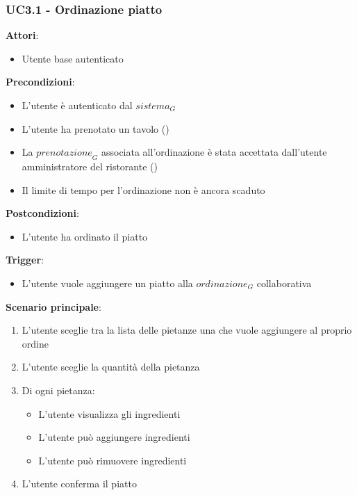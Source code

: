 \subsubsection{UC3.1 - Ordinazione piatto}\label{usecase:3_1}

\textbf{Attori}:
\begin{itemize}
    \item Utente base autenticato
\end{itemize}
\textbf{Precondizioni}:
\begin{itemize}
    \item L'utente è autenticato dal $\textit{sistema}_G$ 
    \item L'utente ha prenotato un tavolo ()
    \item La $\textit{prenotazione}_G$ associata all'ordinazione è stata accettata dall'utente amministratore del ristorante ()
    \item Il limite di tempo per l'ordinazione non è ancora scaduto
\end{itemize}
\textbf{Postcondizioni}:
\begin{itemize}
    \item L'utente ha ordinato il piatto
\end{itemize}
\textbf{Trigger}:
\begin{itemize}
    \item L'utente vuole aggiungere un piatto alla $\textit{ordinazione}_G$ collaborativa
\end{itemize}
\textbf{Scenario principale}:
\begin{enumerate}
    \item L'utente sceglie tra la lista delle pietanze una che vuole aggiungere al proprio ordine
    \item L'utente sceglie la quantità della pietanza
    \item Di ogni pietanza:
    \begin{itemize}
        \item L'utente visualizza gli ingredienti
        \item L'utente può aggiungere ingredienti
        \item L'utente può rimuovere ingredienti
    \end{itemize}
    \item L'utente conferma il piatto
\end{enumerate}
\newpage

